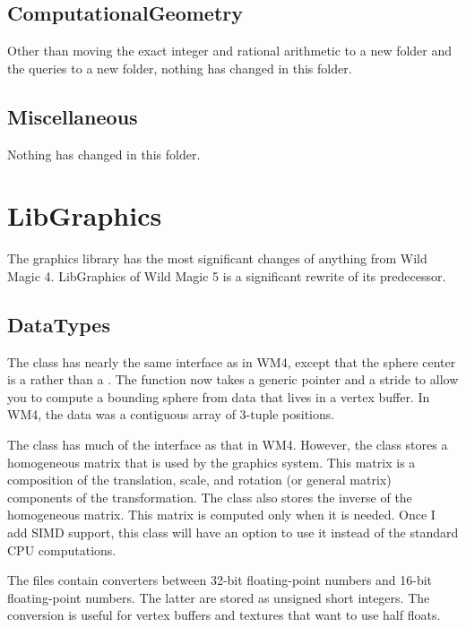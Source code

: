 \documentclass{article}
\begin{document}
\subsection{ComputationalGeometry}

Other than moving the exact integer and rational arithmetic to a new
folder and the queries to a new folder, nothing has changed in this
folder.

\subsection{Miscellaneous}

Nothing has changed in this folder.

\section{LibGraphics}

The graphics library has the most significant changes of anything from Wild
Magic 4.  LibGraphics of Wild Magic 5 is a significant rewrite of its
predecessor.

\subsection{DataTypes}

The  class has nearly the same interface as in WM4, except that
the sphere center is a  rather than a .  The
 function now takes a generic pointer and a
stride to allow you to compute a bounding sphere from data that lives in
a vertex buffer.  In WM4, the data was a contiguous array of 3-tuple
positions.

The  class has much of the interface as that in WM4.  However,
the class stores a homogeneous matrix that is used by the graphics system.
This matrix is a composition of the translation, scale, and rotation (or
general matrix) components of the transformation.  The class also stores the
inverse of the homogeneous matrix.  This matrix is computed only when it is
needed.  Once I add SIMD support, this class will have an option to use it
instead of the standard CPU computations.

The files  contain converters between 32-bit
floating-point numbers and 16-bit floating-point numbers.  The latter are
stored as unsigned short integers.  The conversion is useful for vertex
buffers and textures that want to use half floats.
\end{document}

